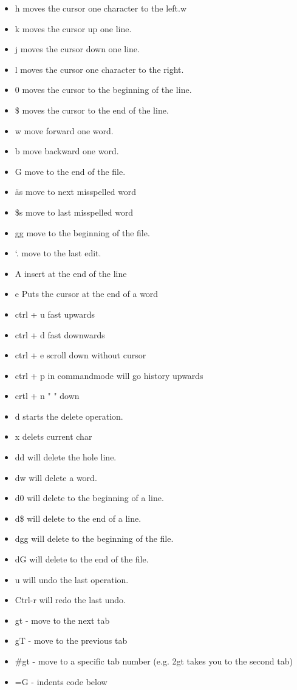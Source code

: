 \documentclass[12pt]{article}
\begin{document}
\begin{itemize}

    \item h moves the cursor one character to the left.w
    \item k moves the cursor up one line.
    \item j moves the cursor down one line.
    \item l moves the cursor one character to the right.
    \item 0 moves the cursor to the beginning of the line.
    \item \$ moves the cursor to the end of the line.
    \item w move forward one word.
    \item b move backward one word.
    \item G move to the end of the file.
    \item äs move to next misspelled word
    \item \$s move to last misspelled word
    \item gg move to the beginning of the file.
    \item `. move to the last edit.
    \item A insert at the end of the line
    \item e  Puts the cursor at the end of a word
    \item ctrl + u  fast upwards
    \item ctrl + d  fast downwards
    \item ctrl + e  scroll down without cursor
    \item ctrl + p in commandmode will go history upwards
    \item crtl + n "                            " down
    \item d starts the delete operation.
    \item x delets current char
    \item dd will delete the hole line.
    \item dw will delete a word.
    \item d0 will delete to the beginning of a line.
    \item d\$ will delete to the end of a line.
    \item dgg will delete to the beginning of the file.
    \item dG will delete to the end of the file.
    \item u will undo the last operation.
    \item Ctrl-r will redo the last undo. \\
    \item gt - move to the next tab
    \item gT - move to the previous tab
    \item \#gt - move to a specific tab number (e.g. 2gt takes you to the second tab)
    \item =G - indents code below


\end{itemize}
\end{document}
